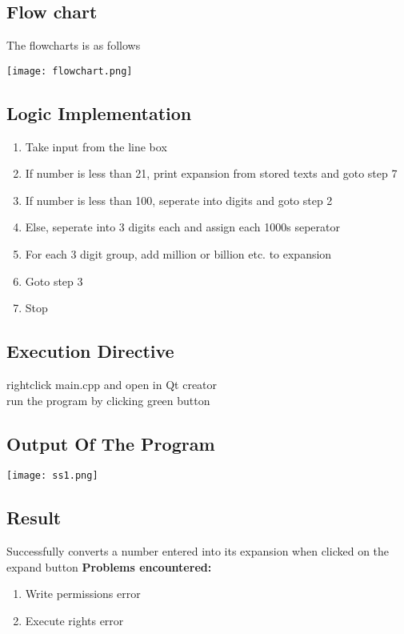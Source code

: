 \documentclass[paper=a4, fontsize=11pt]{scrartcl} %
\numberwithin{equation}{section} %
\numberwithin{figure}{section} %
\numberwithin{table}{section} %
\begin{document}
\newpage
\subsection{Flow chart}
The flowcharts is as follows

 {\center\texttt{[image: flowchart.png]}}\\
\newpage


\subsection{Logic Implementation}
\begin {enumerate}
\item Take input from the line box
\item If number is less than 21, print expansion from stored texts and goto step 7
\item If number is less than 100, seperate into digits and goto step 2
\item Else, seperate into 3 digits each and assign each 1000s seperator
\item For each 3 digit group, add million or billion etc. to expansion
\item Goto step 3
\item Stop
\end{enumerate}

\subsection{Execution Directive}
rightclick main.cpp and open in Qt creator\\
run the program by clicking green button\\

\subsection{Output Of The Program}
\texttt{[image: ss1.png]}\\

\subsection{Result}

Successfully converts a number entered into its expansion when clicked on the expand button
\textbf{Problems encountered:}
\begin{enumerate}
\item Write permissions error
\item Execute rights error
\end{enumerate}
\end{document}
